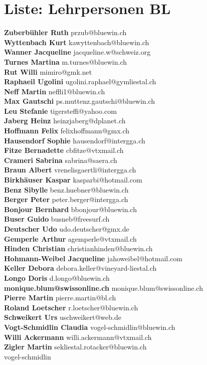 \documentclass{scrartcl}
\begin{document}
\section*{Liste: Lehrpersonen BL}
\textbf{Zuberbühler Ruth } przub@bluewin.ch\\
\textbf{Wyttenbach Kurt } kawyttenbach@bluewin.ch\\
\textbf{Wanner Jacqueline } jacqueline.w@schweiz.org\\
\textbf{Turnes Martina } m.turnes@bluewin.ch\\
\textbf{Rut Willi } mimiro@gmk.net\\
\textbf{Raphaeil Ugolini } ugolini.raphael@gymliestal.ch\\
\textbf{Neff Martin } neffli1@bluewin.ch\\
\textbf{Max Gautschi } ps.muttenz.gautschi@bluewin.ch\\
\textbf{Leu Stefanie } tigersteffi@yahoo.com\\
\textbf{Jaberg Heinz } heinzjaberg@dplanet.ch\\
\textbf{Hoffmann Felix } felixhoffmann@gmx.ch\\
\textbf{Hausendorf Sophie } hausendorf@intergga.ch\\
\textbf{Fitze Bernadette } cbfitze@vtxmail.ch\\
\textbf{Crameri Sabrina } sabrina@saera.ch\\
\textbf{Braun Albert } vrenelisgaertli@intergga.ch\\
\textbf{Birkhäuser Kaspar } kasparbi@hotmail.com\\
\textbf{Benz Sibylle } benz.huebner@bluewin.ch\\
\textbf{Berger Peter } peter.berger@intergga.ch\\
\textbf{Bonjour Bernhard } bbonjour@bluewin.ch\\
\textbf{Buser Guido } busneb@freesurf.ch\\
\textbf{Deutscher Udo } udo.deutscher@gmx.de\\
\textbf{Gemperle Arthur } agemperle@vtxmail.ch\\
\textbf{Hinden Christian } christianhinden@bluewin.ch\\
\textbf{Hohmann-Weibel Jacqueline } jahoweibel@hotmail.com\\
\textbf{Keller Debora } debora.keller@vineyard-liestal.ch\\
\textbf{Longo Doris } d.longo@bluewin.ch\\
\textbf{monique.blum@swissonline.ch } monique.blum@swissonline.ch\\
\textbf{Pierre Martin } pierre.martin@bl.ch\\
\textbf{Roland Loetscher } r.loetscher@bluewin.ch\\
\textbf{Schweikert Urs } uschweikert@web.de\\
\textbf{Vogt-Schmidlin Claudia } vogel-schmidlin@bluewin.ch\\
\textbf{Willi Ackermann } willi.ackermann@vtxmail.ch\\
\textbf{Zigler Martin } sekliestal.rotacker@bluewin.ch\\
\textbf{} vogel-schmidlin\\
\end{document}
